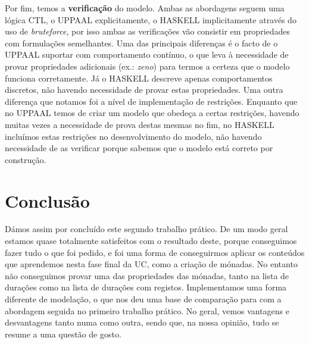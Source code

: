 \documentclass[12pt]{extarticle}
\begin{document}
Por fim, temos a \textbf{verificação} do modelo.
Ambas as abordagens seguem uma lógica CTL, o UPPAAL explicitamente, o HASKELL implicitamente através do uso de \textit{bruteforce}, por isso ambas as verificações vão consistir em propriedades com formulações semelhantes.
Uma das principais diferenças é o facto de o UPPAAL suportar com comportamento contínuo, o que leva à necessidade de provar propriedades adicionais (ex.: \textit{zeno}) para termos a certeza que o modelo funciona corretamente.
Já o HASKELL descreve apenas comportamentos discretos, não havendo necessidade de provar estas propriedades.
Uma outra diferença que notamos foi a nível de implementação de restrições.
Enquanto que no UPPAAL temos de criar um modelo que obedeça a certas restrições, havendo muitas vezes a necessidade de prova destas mesmas no fim, no HASKELL incluímos estas restrições no desenvolvimento do modelo, não havendo necessidade de as verificar porque sabemos que o modelo está correto por construção.


\section{Conclusão}
Dámos assim por concluído este segundo trabalho prático.
De um modo geral estamos quase totalmente satisfeitos com o resultado deste, porque conseguimos fazer tudo o que foi pedido, e foi uma forma de conseguirmos aplicar os conteúdos que aprendemos nesta fase final da UC, como a criação de mónadas. No entanto não conseguimos provar uma das propriedades das mónadas, tanto na lista de durações como na lista de durações com registos.
Implementamos uma forma diferente de modelação, o que nos deu uma base de comparação para com a abordagem seguida no primeiro trabalho prático.
No geral, vemos vantagens e desvantagens tanto numa como outra, sendo que, na nossa opinião, tudo se resume a uma questão de gosto.
\end{document}
